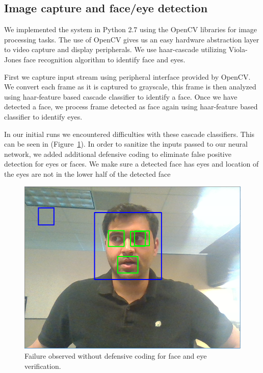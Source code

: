 \documentclass[10pt,twocolumn,letterpaper]{article}
\begin{document}
\subsection{Image capture and face/eye detection}
We implemented the system in Python 2.7 using the OpenCV libraries for 
image processing tasks. The use of OpenCV gives us an easy hardware 
abstraction layer to video capture and display peripherals. We use 
haar-cascade utilizing Viola-Jones face recognition algorithm to 
identify face and eyes. 

First we capture input stream using peripheral
interface provided by OpenCV. We convert each 
frame as it is captured to grayscale, this frame is then analyzed 
using haar-feature based cascade classifier to identify a face. 
Once we have detected a face, we process frame detected 
as face again using haar-feature based classifier to identify eyes. 

In our initial runs we encountered difficulties with these cascade classifiers.
This can be seen in  (Figure~\ref{fig:defensive}).
In order to sanitize the inputs passed to our neural network, we added 
additional defensive coding to eliminate false positive detection 
for eyes or faces. We make sure a detected face has eyes 
and location of the eyes are not in the lower half of the detected face

\begin{figure}
  \begin{center}
    \includegraphics[width=\linewidth]{defensive_coding_example}
  \end{center}
  \caption{Failure observed without defensive coding for face and eye
    verification.}
  \label{fig:defensive}
\end{figure}
\end{document}
